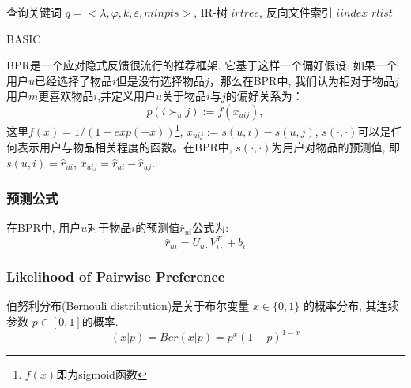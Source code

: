 \IncMargin{1em}
\begin{algorithm}[ht]
	\Require 查询关键词 $q=<\lambda,\varphi,k,\varepsilon,minpts>$, IR-树 $irtree$, 反向文件索引 $iindex$
	\Ensure $rlist$
	\SetAlgoNoLine %
	\BlankLine
	
	\caption{BASIC}
	\label{basic}%
\end{algorithm}
\DecMargin{1em}
BPR是一个应对隐式反馈很流行的推荐框架. 它基于这样一个偏好假设: 如果一个用户$u$已经选择了物品$i$但是没有选择物品$j$，那么在BPR中, 我们认为相对于物品$j$用户$m$更喜欢物品$i$,并定义用户$u$关于物品$i$与$j$的偏好关系为：
\begin{equation}
\label{pairwisepre}
p \left( i \succ_u j \right) := f \left( x_{uij} \right),
\end{equation}
这里$f \left(x\right) = 1/\left(1+exp\left(-x\right)\right)$\footnote{$f \left(x\right)$即为sigmoid函数}, $x_{uij} := s\left(u,i\right) - s\left(u,j\right)$, $s\left(\cdot,\cdot\right)$可以是任何表示用户与物品相关程度的函数。在BPR中, $s\left(\cdot,\cdot\right)$为用户对物品的预测值, 即$s\left(u,i\right) = \hat{r}_{ui}$, $x_{uij} = \hat{r}_{ui}-\hat{r}_{uj}$.


\subsubsection{预测公式}

在BPR中, 用户$u$对于物品$i$的预测值$\hat{r}_{ui}$公式为:
\begin{equation}
\hat{r}_{ui} = U_{u\cdot}V_{i\cdot}^T + b_i
\end{equation}


\subsubsection{Likelihood of Pairwise Preference}

伯努利分布(Bernouli distribution)是关于布尔变量 $x \in \{0,1\}$ 的概率分布, 其连续参数 $p \in \left[0,1\right]$的概率.
\begin{equation}
\left( x|p \right) = Ber\left(x|p \right)=p^x\left(1-p \right)^{1-x}
\end{equation}

